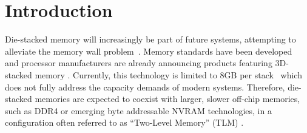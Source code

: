 \section{Introduction}
\label{sec:Introduction}
  


Die-stacked memory will increasingly be part of future systems, 
attempting to alleviate 
the memory wall problem~\cite{wulf-can95}. Memory standards have been developed~\cite{jedec-wideio,JEDEC-HBM,pawlowski-hotchips2011} and processor manufacturers are 
already announcing products featuring 3D-stacked memory \cite{KnightsLanding,NVIDIA,black-micro2013,AMD-FURY}. 
Currently, this technology is limited to 8GB per stack~\cite{JEDEC-HBM-REVISED}
which does not fully address the capacity demands of modern systems. 
Therefore, die-stacked memories are expected to coexist with larger, 
slower off-chip memories, such as DDR4 or emerging byte addressable NVRAM \cite{NVDIMM,Xpoint,PCM-extremetech} technologies, in a configuration often
referred to as ``Two-Level Memory'' (TLM) \cite{cameo,meswani-HPCA21}. 

